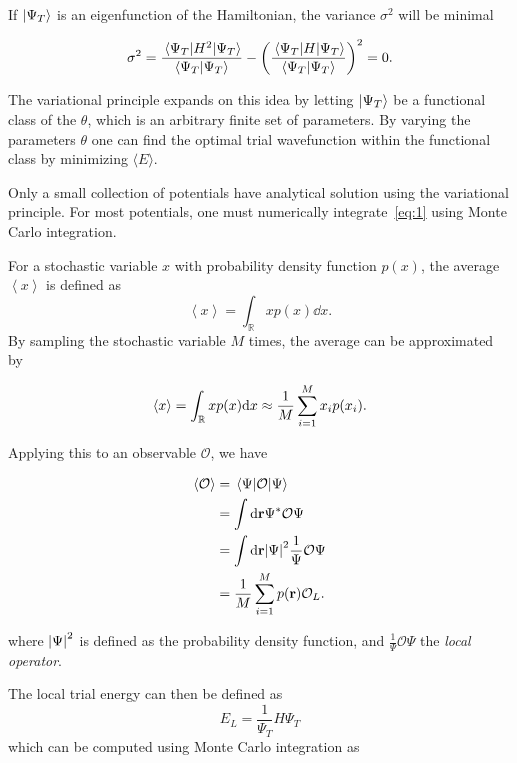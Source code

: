 If \(\ket{\Psi_{T}}\) is an eigenfunction of the Hamiltonian, the variance
\(\sigma^{2}\) will be minimal

\begin{equation*}
  \sigma^{2} = \frac{\ev{H^{2}}{\Psi_{T}}}{\ip{\Psi_{T}}} -\left( \frac{\ev{H}{\Psi_{T}}}{\ip{\Psi_{T}}} \right)^{2} = 0.
\end{equation*}

The variational principle expands on this idea by letting \(\ket{\Psi_{T}}\) be
a functional class of the \(\theta\), which is an arbitrary finite set of parameters. By varying the parameters
\(\theta\) one can find the optimal trial wavefunction within the functional
class by minimizing \(\langle E \rangle \). 

Only a small collection of potentials have analytical solution using the
variational principle. For most potentials, one must numerically
integrate~\eqref{eq:1} using Monte Carlo integration.

For a stochastic variable \(x\) with probability density function \(p(x)\), the
average \(\left< x \right>\) is defined as
\begin{equation*}
  \left< x \right> = \int_{\mathbb{R}} xp(x)\dd x.
\end{equation*}
By sampling the stochastic variable \(M\) times, the average can be approximated
by 

\begin{equation*}
  \expval{x} = \int_{\mathbb{R}} xp(x)\dd x \approx \frac{1}{M}\sum_{i=1}^{M}x_{i}p(x_{i}).
\end{equation*}

Applying this to an observable \(\mathcal{O}\), we have

\begin{align*}
  \expval{\mathcal{O}} &= \ev{\mathcal{O}}{\Psi}\\
                       &= \int \dd \vb{r} \Psi^{*}\mathcal{O}\Psi \\
                       &= \int \dd \vb{r} \abs{\Psi}^{2} \frac{1}{\Psi}\mathcal{O}\Psi\\
  &= \frac{1}{M} \sum_{i=1}^{M}p(\vb{r})\mathcal{O}_{L}.
\end{align*}

where \(\abs{\Psi}^{2}\) is defined as the probability density function, and
\(\frac{1}{\Psi}\mathcal{O}\Psi\) the \textit{local operator}.

The local trial energy can then be defined as
\begin{equation*}
  E_{L} =\frac{1}{\Psi_{T}}H\Psi_{T}
\end{equation*}
which can be computed using Monte Carlo integration as

